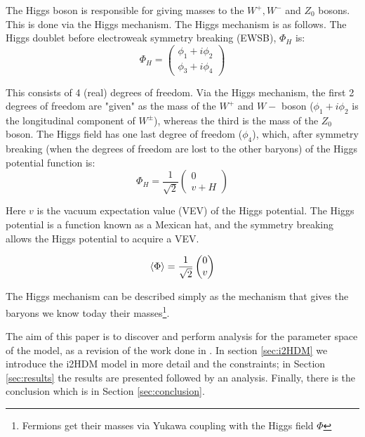 \documentclass[12pt]{article}
\begin{document}
The Higgs boson is responsible for giving masses to the $W^+, W^-$ and $Z_0$ bosons. This is done via the Higgs mechanism. The Higgs mechanism is as follows.
The Higgs doublet before electroweak symmetry breaking (EWSB), $\Phi_H$ is:
\begin{equation}
    \Phi_H =
    \begin{pmatrix}
        {\phi_1 + i\phi_2} \\
        {\phi_3 + i\phi_4}
    \end{pmatrix}
\end{equation}

This consists of 4 (real) degrees of freedom. Via the Higgs mechanism, the first 2 degrees of freedom are "given" as the mass of the $W^+$ and $W-$ boson ($\phi_1 + i\phi_2$ is the longitudinal component of $W^\pm$), whereas the third is the mass of the $Z_0$ boson. The Higgs field has one last degree of freedom ($\phi_4$), which, after symmetry breaking (when the degrees of freedom are lost to the other baryons) of the Higgs potential function is: 
\begin{equation}
    \Phi_H = \frac{1}{\sqrt{2}}
    \begin{pmatrix}
        {0} \\
        {v + H}
    \end{pmatrix}
\end{equation}

Here $v$ is the vacuum expectation value (VEV) of the Higgs potential. The Higgs potential is a function known as a Mexican hat, and the symmetry breaking allows the Higgs potential to acquire a VEV.

\begin{equation}
    \braket{\Phi} = \frac{1}{\sqrt{2}}
    \begin{pmatrix}
        0\\
        v
    \end{pmatrix}
\end{equation}

The Higgs mechanism can be described simply as the mechanism that gives the baryons we know today their masses\footnote{Fermions get their masses via Yukawa coupling with the Higgs field $\Phi$}.

The aim of this paper is to discover and perform analysis for the parameter space of the model, as a revision of the work done in \cite{Belyaev:2016lok}. In section \ref{sec:i2HDM} we introduce the i2HDM model in more detail and the constraints; in Section \ref{sec:results} the results are presented followed by an analysis. Finally, there is the conclusion which is in Section \ref{sec:conclusion}.
\end{document}
